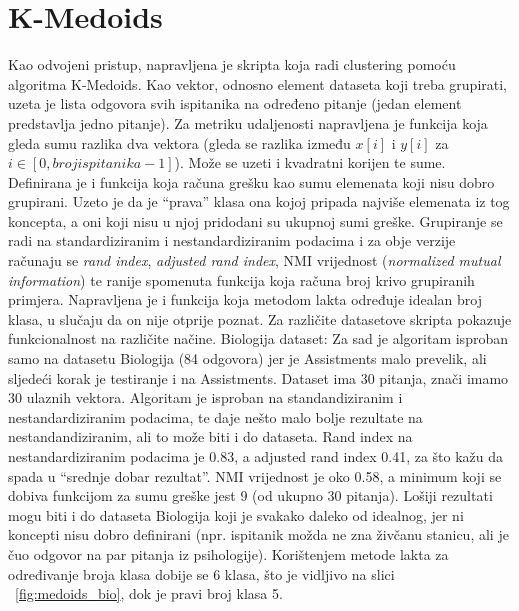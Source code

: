 \section{K-Medoids}
Kao odvojeni pristup, napravljena je skripta koja radi clustering pomoću algoritma K-Medoids.\newline
Kao vektor, odnosno element dataseta koji treba grupirati, uzeta je lista odgovora svih ispitanika na određeno pitanje (jedan element predstavlja jedno pitanje). Za metriku udaljenosti napravljena je funkcija koja gleda sumu razlika dva vektora (gleda se razlika između $x[i]$ i $y[i]$ za $i \in [0, broj ispitanika-1]$). Može se uzeti i kvadratni korijen te sume.\newline
Definirana je i funkcija koja računa grešku kao sumu elemenata koji nisu dobro grupirani. Uzeto je da je “prava” klasa ona kojoj pripada najviše elemenata iz tog koncepta, a oni koji nisu u njoj pridodani su ukupnoj sumi greške. 
Grupiranje se radi na standardiziranim i nestandardiziranim podacima i za obje verzije računaju se \textit{rand index}, \textit{adjusted rand index}, NMI vrijednost (\textit{normalized mutual information}) te ranije spomenuta funkcija koja računa broj krivo grupiranih primjera.\newline
Napravljena je i funkcija koja metodom lakta određuje idealan broj klasa, u slučaju da on nije otprije poznat.
\newline
\newline
Za različite datasetove skripta pokazuje funkcionalnost na različite načine.\newline
Biologija dataset:\newline
Za sad je algoritam isproban samo na datasetu Biologija (84 odgovora) jer je Assistments malo prevelik, ali sljedeći korak je testiranje i na Assistments.\newline
Dataset ima 30 pitanja, znači imamo 30 ulaznih vektora. Algoritam je isproban na standandiziranim i nestandardiziranim podacima, te daje nešto malo bolje rezultate na nestandandiziranim, ali to može biti i do dataseta. 
Rand index na nestandardiziranim podacima je 0.83, a adjusted rand index 0.41, za što kažu da spada u “srednje dobar rezultat”. NMI vrijednost je oko 0.58, a minimum koji se dobiva funkcijom za sumu greške jest 9 (od ukupno 30 pitanja). Lošiji rezultati mogu biti i do dataseta Biologija koji je svakako daleko od idealnog, jer ni koncepti nisu dobro definirani (npr. ispitanik možda ne zna živčanu stanicu, ali je čuo odgovor na par pitanja iz psihologije). 
Korištenjem metode lakta za određivanje broja klasa dobije se 6 klasa, što je vidljivo na slici ~\ref{fig:medoids_bio}, dok je pravi broj klasa 5.\newline

